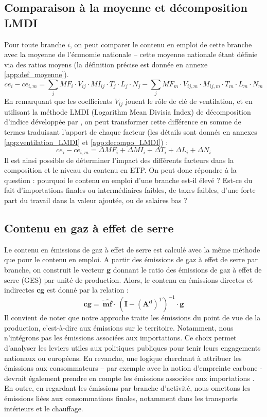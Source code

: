 \subsection{Comparaison à la moyenne et décomposition LMDI}
Pour toute branche $i$, on peut comparer le contenu en emploi de cette branche avec la moyenne de l’économie nationale – cette moyenne nationale étant définie via des ratios moyens (la définition précise est donnée en annexe \ref{app:def_moyenne}).
\begin{equation}
ce_i - ce_{i,m} = \sum_j MF_i \cdot V_{ij} \cdot MI_{ij} \cdot T_j \cdot L_j \cdot N_j - \sum_j MF_m \cdot V_{ij,m} \cdot M_{ij,m} \cdot T_m \cdot L_m \cdot N_m
\end{equation}
En remarquant que les coefficients $V_{ij}$ jouent le rôle de clé de ventilation, et en utilisant la méthode LMDI (Logarithm Mean Divisia Index) de décomposition d’indice développée par \citet{Ang2005}, on peut transformer cette différence en somme de termes traduisant l’apport de chaque facteur (les détails sont donnés en annexes \ref{app:ventilation_LMDI} et \ref{app:decompo_LMDI}) :
\begin{equation}
ce_i - ce_{i,m} = \Delta MF_i + \Delta MI_i + \Delta T_i +\Delta L_i + \Delta N_i
\end{equation}
Il est ainsi possible de déterminer l’impact des différents facteurs dans la composition et le niveau du contenu en ETP. On peut donc répondre à la question : pourquoi le contenu en emploi d’une branche est-il élevé ? Est-ce du fait d’importations finales ou intermédiaires faibles, de taxes faibles, d’une forte part du travail dans la valeur ajoutée, ou de salaires bas ?


\subsection{Contenu en gaz à effet de serre}
Le contenu en émissions de gaz à effet de serre est calculé avec la même méthode que pour le contenu en emploi. A partir des émissions de gaz à effet de serre par branche, on construit le vecteur $\pmb{g}$ donnant le ratio des émissions de gaz à effet de serre (GES) par unité de production. Alors, le contenu en émissions directes et indirectes $\pmb{cg}$ est donné par la relation :
\begin{equation}
\pmb{cg} =~\widehat{\pmb{mf}} \cdot~(\pmb{I} - (\pmb{A^d})^T)^{-1} \cdot \pmb{g}
\end{equation}
Il convient de noter que notre approche traite les émissions du point de vue de la production, c’est-à-dire aux émissions sur le territoire. Notamment, nous n’intégrons pas les émissions associées aux importations. Ce choix permet d’analyser les leviers utiles aux politiques publiques pour tenir leurs engagements nationaux ou européens. En revanche, une logique cherchant à attribuer les émissions aux consommateurs – par exemple avec la notion d’empreinte carbone - devrait également prendre en compte les émissions associées aux importations \citep{Pasquier2012}. En outre, en regardant les émissions par branche d’activité, nous omettons les émissions liées aux consommations finales, notamment dans les transports intérieurs et le chauffage. 


